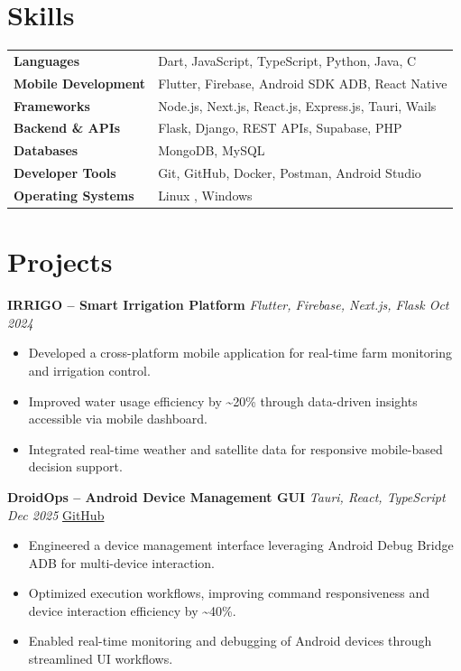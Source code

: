\documentclass[10pt, a4paper]{article}
\begin{document}
\section*{Skills}

\renewcommand{\arraystretch}{1.05}
\begin{tabular}{@{} >{\bfseries}p{3.8cm} p{13cm} @{}}
Languages           & Dart, JavaScript, TypeScript, Python, Java, C \\
Mobile Development  & Flutter, Firebase, Android SDK ADB, React Native \\
Frameworks          & Node.js, Next.js, React.js, Express.js, Tauri, Wails \\
Backend \& APIs     & Flask, Django, REST APIs, Supabase, PHP \\
Databases           & MongoDB, MySQL \\
Developer Tools     & Git, GitHub, Docker, Postman, Android Studio \\
Operating Systems   & Linux , Windows \\
\end{tabular}

\section*{Projects}

\textbf{IRRIGO -- Smart Irrigation Platform} \hfill \textit{Flutter, Firebase, Next.js, Flask \quad Oct 2024}
\begin{itemize}
\item Developed a cross-platform mobile application for real-time farm monitoring and irrigation control.
\item Improved water usage efficiency by \textasciitilde{}20\% through data-driven insights accessible via mobile dashboard.
\item Integrated real-time weather and satellite data for responsive mobile-based decision support.
\end{itemize}

\vspace{3pt}

\textbf{DroidOps -- Android Device Management GUI} \hfill \textit{Tauri, React, TypeScript \quad Dec 2025} \quad \href{https://github.com/bbinxx/droidops}{GitHub}
\begin{itemize}
\item Engineered a device management interface leveraging Android Debug Bridge ADB for multi-device interaction.
\item Optimized execution workflows, improving command responsiveness and device interaction efficiency by \textasciitilde{}40\%.
\item Enabled real-time monitoring and debugging of Android devices through streamlined UI workflows.
\end{itemize}
\end{document}
